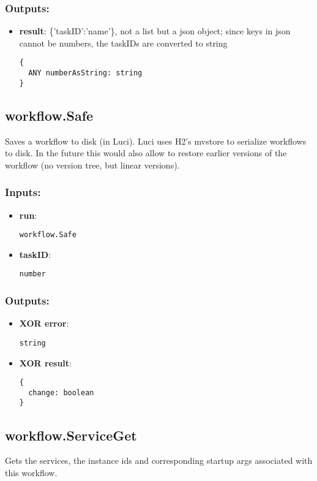 \subsubsection*{Outputs:}
\begin{itemize}
  \small
    \item \textbf{result}: \{'taskID':'name'\}, not a list but a json object; since keys in json cannot be numbers, the taskIDs are converted to string
\begin{lstlisting}
{
  ANY numberAsString: string
}
\end{lstlisting}
  \end{itemize}

\subsection{workflow.Safe}
\label{ch:builtinservices:workflow.Safe}
Saves
 a workflow to disk (in Luci). Luci uses H2's mvstore to serialize 
workflows to disk. In the future this would also allow to restore 
earlier versions of the workflow (no version tree, but linear versions).
\subsubsection*{Inputs:}
\begin{itemize}
  \small
    \item \textbf{run}: 
\begin{lstlisting}
workflow.Safe
\end{lstlisting}
    \item \textbf{taskID}: 
\begin{lstlisting}
number
\end{lstlisting}
  \end{itemize}
\subsubsection*{Outputs:}
\begin{itemize}
  \small
    \item \textbf{XOR error}: 
\begin{lstlisting}
string
\end{lstlisting}
    \item \textbf{XOR result}: 
\begin{lstlisting}
{
  change: boolean
}
\end{lstlisting}
  \end{itemize}

\subsection{workflow.ServiceGet}
\label{ch:builtinservices:workflow.ServiceGet}
Gets the services, the instance ids and corresponding startup args associated with this workflow.
